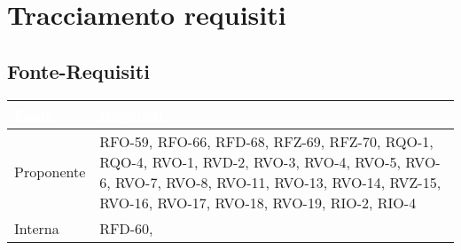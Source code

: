 \section{Tracciamento requisiti}

\subsection{Fonte-Requisiti}
\renewcommand{\arraystretch}{1.45}
\begin{xltabular}{\textwidth}{|X| X |}
    \hline
     \textbf{\textcolor{white}{Fonte}} & \textbf{\textcolor{white}{Requisiti}}\\
    \hline
    \endhead
    Proponente & RFO-59, \newline
                RFO-66, \newline
                RFD-68, \newline
                RFZ-69, \newline
                RFZ-70, \newline
                RQO-1, \newline
                RQO-4, \newline
                RVO-1, \newline
                RVD-2, \newline
                RVO-3, \newline
                RVO-4, \newline
                RVO-5, \newline
                RVO-6, \newline
                RVO-7, \newline
                RVO-8, \newline
                RVO-11, \newline
                RVO-13, \newline
                RVO-14, \newline
                RVZ-15, \newline
                RVO-16, \newline
                RVO-17, \newline
                RVO-18, \newline
                RVO-19, \newline
                RIO-2, \newline
                RIO-4 \\
    \hline
     Interna &  RFD-60, \newline 

\end{xltabular}
